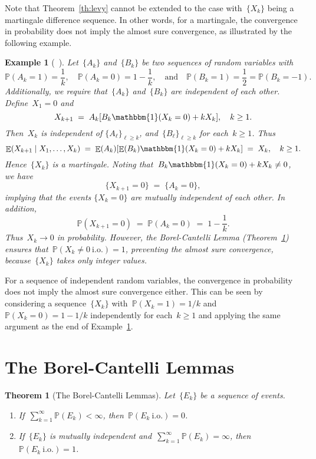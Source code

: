 \documentclass[12pt,a4paper]{article}  %
\newcounter{cite}
\newtheorem{theorem}{Theorem}[section]
\newtheorem{example}{Example}[section]
\theoremstyle{definition}
\numberwithin{equation}{section}
\newcommand{\ind}{\mathbbm{1}}
\newcommand{\io}{{\text{i.o.}}\xspace}
\newcommand{\iid}{{\text{i.i.d.}}\xspace}
\DeclareMathOperator{\expc}{\mathbb{E}}
\renewcommand{\Pr}{\mathbb{P}}
\begin{document}
Note that Theorem~\ref{th:levy} cannot be extended to the case with~$\{X_k\}$ being a martingale
difference sequence. In other words, for a martingale, the convergence in probability does not imply
the almost sure convergence, as illustrated by the following example.

\begin{example}[\mbox{~\cite[Example 4.2.14]{Durrett_2019}}]
    \label{exp:durret}
    Let~$\{A_k\}$ and~$\{B_k\}$ be two sequences of \iid random variables with
    \[
        \Pr(A_k = 1) = \frac{1}{k}, \quad \Pr(A_k = 0) = 1-\frac{1}{k},
        \quad \text{and} \quad
        \Pr(B_k=1) = \frac{1}{2} = \Pr(B_k = -1).
    \]
    Additionally, we require that~$\{A_k\}$ and~$\{B_k\}$ are independent of each other.
    Define~$X_1 = 0$ and
    \[
        X_{k+1} \;=\;  A_k[B_k \ind(X_k=0) + k X_k], \quad k \ge 1.
    \]
    Then~$X_k$ is independent of $\{A_\ell\}_{\ell \ge k}$, and~$\{B_\ell\}_{\ell\ge k}$  for
    each~$k\ge 1$. Thus
    \[
        \expc(X_{k+1} \mathrel{|} X_1, \ldots, X_k)
        \;=\;
        \expc(A_k) [\expc(B_k) \ind(X_k=0) + k X_k]
        \;=\; X_k, \quad k \ge 1.
    \]
    Hence~$\{X_k\}$ is a martingale. Noting that~$B_k \ind(X_k=0) + k X_k \neq 0$, we have
    \[
        \{X_{k+1} =0\} \;=\; \{A_k = 0\},
    \]
    implying that the events $\{X_k = 0\}$ are mutually
    independent of each other. In addition,
    \[
        \Pr(X_{k+1} = 0) \;=\; \Pr(A_k = 0) \;=\;  1-\frac{1}{k}.
    \]
    Thus~$X_k \to 0$ in probability. However, the Borel-Cantelli Lemma
    \textnormal{(}Theorem~\ref{th:bc}\textnormal{)}
    ensures that~$\Pr(X_k \neq 0~\io) = 1$, preventing the almost sure convergence,
    because~$\{X_k\}$ takes only integer values.
\end{example}

For a sequence of independent random variables, the convergence in probability does not imply
the  almost sure convergence either. This can be seen by considering a sequence~$\{X_k\}$ with~$\Pr(X_k = 1) = 1/k$
and~$\Pr(X_k = 0) = 1-1/k$ independently for each~$k\ge 1$ and applying the same argument as the
end of Example~\ref{exp:durret}.


\section{The Borel-Cantelli Lemmas}
\label{sec:bc}

\begin{theorem}[The Borel-Cantelli Lemmas]
    \label{th:bc}
    Let~$\{E_k\}$ be a sequence of events.
    \begin{enumerate}
        \item If~$\sum_{k=1}^\infty \Pr(E_k) < \infty$, then~$\Pr(E_k~\io) = 0$.
        \item If~$\{E_k\}$ is mutually independent and~$\sum_{k=1}^\infty \Pr(E_k)
            = \infty$, then~$\Pr(E_k~\io) = 1$.
    \end{enumerate}
\end{theorem}
\end{document}
